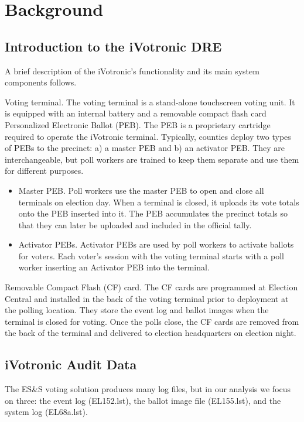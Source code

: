 \documentclass[letterpaper,twocolumn,10pt]{article}
\begin{document}
\section{Background}
\subsection{Introduction to the iVotronic DRE}
A brief description of the iVotronic's functionality and its main system
components follows.  

\begin{description}
\item{Voting terminal.} The voting terminal is a stand-alone touchscreen voting
  unit. It is equipped with an internal battery and a removable compact flash
  card Personalized Electronic Ballot (PEB). The PEB is a proprietary cartridge
  required to operate the iVotronic terminal. Typically, counties deploy two
  types of PEBs to the precinct: a) a master PEB and b) an activator PEB. They
  are interchangeable, but poll workers are trained to keep them separate and
  use them for different purposes.
\begin{itemize}
\item{Master PEB.} Poll workers use the master PEB to open and close all
  terminals on election day. When a terminal is closed, it uploads its vote
  totals onto the PEB inserted into it. The PEB accumulates the precinct totals
  so that they can later be uploaded and included in the official tally.
\item{Activator PEBs.} Activator PEBs are used by poll workers to activate ballots
  for voters. Each voter’s session with the voting terminal starts with a poll
  worker inserting an Activator PEB into the terminal. 
\end{itemize}
\item{Removable Compact Flash (CF) card.} The CF cards are programmed at Election
  Central and installed in the back of the voting terminal prior to deployment
  at the polling location. They store the event log and ballot images when the
  terminal is closed for voting. Once the polls close, the CF cards are removed
  from the back of the terminal and delivered to election headquarters on
  election night.
\end{description}

\subsection{iVotronic Audit Data}
The ES\&S voting solution produces many log files, but in our analysis we focus
on three: the event log (EL152.lst), the ballot image file (EL155.lst), and the
system log (EL68a.lst). 
\end{document}

